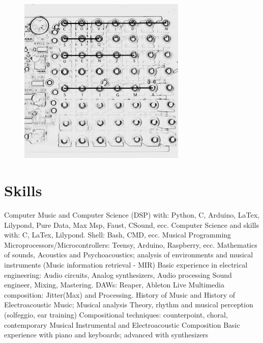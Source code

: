 \documentclass[12pt,landscape]{article}
\begin{document}
{\begin{center}
\begin{figure}[!htb]
\endminipage\hfill
{}%
  \includegraphics[width=8cm]{covidnsequenze.jpg}

\endminipage
\end{figure}

\clearpage


\section*{Skills}

Computer Music and Computer Science (DSP) with: 
\newline
Python, C, Arduino, LaTex, Lilypond, Pure Data,
Max Msp, Faust, CSound, ecc.
\newline
Computer Science and skills with: C, LaTex, Lilypond. Shell: Bash, CMD, ecc.
\newline
Musical Programming Microprocessors/Microcontrollers: Teensy, Arduino, Raspberry, ecc.
\newline
Mathematics of sounds, Acoustics and Psychoacoustics; analysis of environments and musical instruments
(Music information retrieval - MIR)
\newline
Basic experience in electrical engineering: Audio circuits, Analog synthesizers, Audio processing
\newline
Sound engineer, Mixing, Mastering. DAWs: Reaper, Ableton Live
\newline
Multimedia composition: Jitter(Max) and Processing.
\newline
History of Music and History of Electroacoustic Music; Musical analysis
\newline
Theory, rhythm and musical perception (solfeggio, ear training)
\newline
Compositional techniques: counterpoint, choral, contemporary
\newline
Musical Instrumental and Electroacoustic Composition
\newline
Basic experience with piano and keyboards; advanced with synthesizers


\end{center}}
\end{document}
